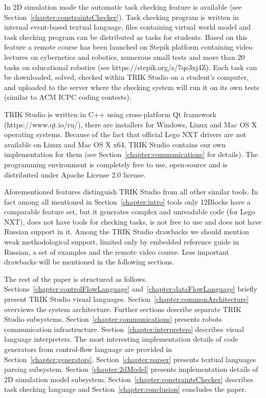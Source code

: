 \documentclass[conference]{IEEEtran}
\begin{document}
In 2D simulation mode the automatic task checking feature is available (see Section~\ref{chapter:constraintsChecker}). Task checking program is written in internal event-based textual language, files containing virtual world model and task checking program can be distributed as tasks for students. Based on this feature a remote course has been launched on Stepik platform containing video lectures on cybernetics and robotics, numerous small tests and more than 20 tasks on educational robotics (see https://stepik.org/s/7qe3xj4Z). Each task can be downloaded, solved, checked within TRIK Studio on a student's computer, and uploaded to the server where the checking system will run it on its own tests (similar to ACM ICPC coding contests).

TRIK Studio is written in C++ using cross-platform Qt framework (https://www.qt.io/ru/), there are installers for Windows, Linux and Mac OS X operating systems. Because of the fact that official Lego NXT drivers are not available on Linux and Mac OS X x64, TRIK Studio contains our own implementation for them (see Section~\ref{chapter:communications} for details). The programming environment is completely free to use, open-source and is distributed under Apache License 2.0 license.

Aforementioned features distinguish TRIK Studio from all other similar tools. In fact among all mentioned in Section~\ref{chapter:intro} tools only 12Blocks have a comparable feature set, but it generates complex and unreadable code (for Lego NXT), does not have tools for checking tasks, is not free to use and does not have Russian support in it. Among the TRIK Studio drawbacks we should mention weak methodological support, limited only by embedded reference guide in Russian, a set of examples and the remote video course. Less important drawbacks will be mentioned in the following sections. 

The rest of the paper is structured as follows. Sections~\ref{chapter:controlFlowLanguage} and~\ref{chapter:dataFlowLanguage} briefly present TRIK Studio visual languages. Section~\ref{chapter:commonArchitecture} overviews the system architecture. Further sections describe separate TRIK Studio subsystems. Section~\ref{chapter:communications} presents robots communication infrastructure. Section~\ref{chapter:interpreters} describes visual language interpreters. The most interesting implementation details of code generators from control-flow language are provided in Section~\ref{chapter:generators}. Section~\ref{chapter:parser} presents textual languages parsing subsystem. Section~\ref{chapter:2dModel} presents implementation details of 2D simulation model subsystem. Section~\ref{chapter:constraintsChecker} describes task checking language and Section~\ref{chapter:conclusion} concludes the paper.
\end{document}
